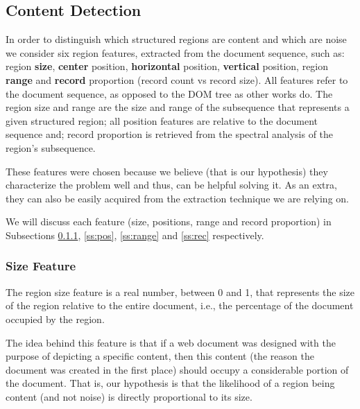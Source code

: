 \subsection{Content Detection}\label{ss:content}
In order to distinguish which structured regions are content and which are noise
we consider six region features, extracted from the document sequence, such as:
region \textbf{size}, \textbf{center} position, \textbf{horizontal} position,
\textbf{vertical} position, region \textbf{range} and \textbf{record} proportion
(record count vs record size). All features refer to the document sequence, as
opposed to the DOM tree as other works do. The region size and range are the
size and range of the subsequence that represents a given structured region; all
position features are relative to the document sequence and; record proportion is
retrieved from the spectral analysis of the region's subsequence.

These features were chosen because we believe (that is our hypothesis) they
characterize the problem well and thus, can be helpful solving it.
As an extra, they can also be easily acquired from the extraction technique we
are relying on.

We will discuss each feature (size, positions, range and record proportion) in
Subsections \ref{ss:size}, \ref{ss:pos}, \ref{ss:range} and \ref{ss:rec}
respectively.

\subsubsection{Size Feature}\label{ss:size}
The region size feature is a real number, between 0 and 1, that represents the
size of the region relative to the entire document, i.e., the percentage of the
document occupied by the region.

The idea behind this feature is that if a web document was designed with the
purpose of depicting a specific content, then this content (the reason the
document was created in the first place) should occupy a considerable portion of
the document. That is, our hypothesis is that the likelihood of a region being
content (and not noise) is directly proportional to its size.

